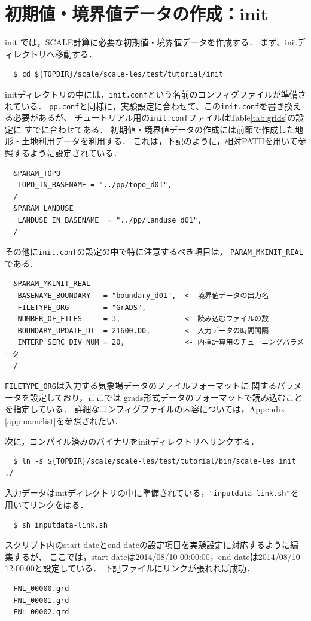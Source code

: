 
\section{初期値・境界値データの作成：init}

init では，SCALE計算に必要な初期値・境界値データを作成する．
まず、initディレクトリへ移動する．
\begin{verbatim}
  $ cd ${TOPDIR}/scale/scale-les/test/tutorial/init
\end{verbatim}

initディレクトリの中には，\verb|init.conf|という名前のコンフィグファイルが準備されている．
\verb|pp.conf|と同様に，実験設定に合わせて、この\verb|init.conf|を書き換える必要があるが、
チュートリアル用の\verb|init.conf|ファイルはTable\ref{tab:grids}の設定に
すでに合わせてある．
初期値・境界値データの作成には前節で作成した地形・土地利用データを利用する．
これは，下記のように，相対PATHを用いて参照するように設定されている．

\begin{verbatim}
  &PARAM_TOPO
   TOPO_IN_BASENAME = "../pp/topo_d01",
  /
  &PARAM_LANDUSE
   LANDUSE_IN_BASENAME  = "../pp/landuse_d01",
  /
\end{verbatim}
その他に\verb|init.conf|の設定の中で特に注意するべき項目は，
\verb|PARAM_MKINIT_REAL|である．

\begin{verbatim}
  &PARAM_MKINIT_REAL
   BASENAME_BOUNDARY   = "boundary_d01",  <- 境界値データの出力名
   FILETYPE_ORG        = "GrADS",
   NUMBER_OF_FILES     = 3,               <- 読み込むファイルの数
   BOUNDARY_UPDATE_DT  = 21600.D0,        <- 入力データの時間間隔
   INTERP_SERC_DIV_NUM = 20,              <- 内挿計算用のチューニングパラメータ
  /
\end{verbatim}

\verb|FILETYPE_ORG|は入力する気象場データのファイルフォーマットに
関するパラメータを設定しており，ここでは
grads形式データのフォーマットで読み込むことを指定している．
詳細なコンフィグファイルの内容については，Appendix \ref{app:namelist}を参照されたい．

次に，コンパイル済みのバイナリをinitディレクトリへリンクする．
\begin{verbatim}
  $ ln -s ${TOPDIR}/scale/scale-les/test/tutorial/bin/scale-les_init ./
\end{verbatim}
入力データはinitディレクトリの中に準備されている，\verb|"inputdata-link.sh"|を用いてリンクをはる．
\begin{verbatim}
  $ sh inputdata-link.sh
\end{verbatim}
スクリプト内のstart dateとend dateの設定項目を実験設定に対応するように編集するが、
ここでは，start dateは2014/08/10 00:00:00，end dateは2014/08/10 12:00:00と設定している．
下記ファイルにリンクが張れれば成功．
{\small
\begin{verbatim}
  FNL_00000.grd
  FNL_00001.grd
  FNL_00002.grd
\end{verbatim} }

